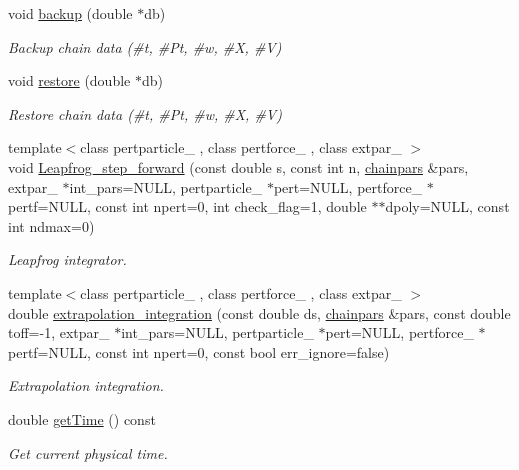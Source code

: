 \begin{DoxyCompactItemize}
void \hyperlink{classARC_1_1chain_a3ad5d3a5a2e899ec55bd4aafaa18c2d2}{backup} (double $\ast$db)
\begin{DoxyCompactList}\small\item\em Backup chain data (\#t, \#\+Pt, \#w, \#X, \#V) \end{DoxyCompactList}\item 
void \hyperlink{classARC_1_1chain_a5eb2661715a3bf90cad65503f4a5e184}{restore} (double $\ast$db)
\begin{DoxyCompactList}\small\item\em Restore chain data (\#t, \#\+Pt, \#w, \#X, \#V) \end{DoxyCompactList}\item 
{\footnotesize template$<$class pertparticle\+\_\+ , class pertforce\+\_\+ , class extpar\+\_\+ $>$ }\\void \hyperlink{classARC_1_1chain_a0e375d50ca9a4c01f780dd5698fe6914}{Leapfrog\+\_\+step\+\_\+forward} (const double s, const int n, \hyperlink{classARC_1_1chainpars}{chainpars} \&pars, extpar\+\_\+ $\ast$int\+\_\+pars=N\+U\+LL, pertparticle\+\_\+ $\ast$pert=N\+U\+LL, pertforce\+\_\+ $\ast$pertf=N\+U\+LL, const int npert=0, int check\+\_\+flag=1, double $\ast$$\ast$dpoly=N\+U\+LL, const int ndmax=0)
\begin{DoxyCompactList}\small\item\em Leapfrog integrator. \end{DoxyCompactList}\item 
{\footnotesize template$<$class pertparticle\+\_\+ , class pertforce\+\_\+ , class extpar\+\_\+ $>$ }\\double \hyperlink{classARC_1_1chain_acd19e23d46d38d66c5eb60a2e9afe727}{extrapolation\+\_\+integration} (const double ds, \hyperlink{classARC_1_1chainpars}{chainpars} \&pars, const double toff=-\/1, extpar\+\_\+ $\ast$int\+\_\+pars=N\+U\+LL, pertparticle\+\_\+ $\ast$pert=N\+U\+LL, pertforce\+\_\+ $\ast$pertf=N\+U\+LL, const int npert=0, const bool err\+\_\+ignore=false)
\begin{DoxyCompactList}\small\item\em Extrapolation integration. \end{DoxyCompactList}\item 
double \hyperlink{classARC_1_1chain_a68f54fe8b09bd61838d6227ff4e533d1}{get\+Time} () const
\begin{DoxyCompactList}\small\item\em Get current physical time. \end{DoxyCompactList}\item 
$$
\end{DoxyCompactItemize}

